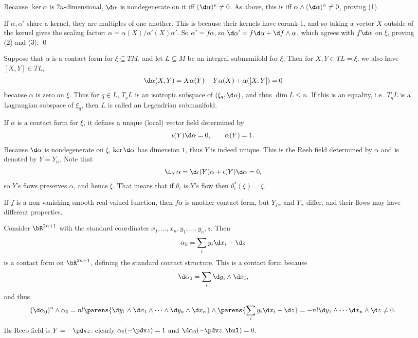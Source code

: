 \eprop

\bproof

    Because $\ker\alpha$ is $2n$-dimensional, $\d\alpha$ is nondegenerate on it iff $(\d\alpha)^n\neq0$.
    As above, this is iff $\alpha\wedge(\d\alpha)^n\neq0$, proving (1).

    If $\alpha,\alpha'$ share a kernel, they are multiples of one another.
    This is because their kernels have corank-$1$, and so taking a vector $X$ outside of the kernel gives
    the scaling factor: $\alpha=\alpha(X)/\alpha'(X)\alpha'$.
    So $\alpha'=f\alpha$, so $\d\alpha'=f\d\alpha+\d f\wedge\alpha$, which agrees with $f\d\alpha$
    on $\xi$, proving (2) and (3).
    \qed

\eproof

Suppose that $\alpha$ is a contact form for $\xi\subseteq TM$, and let $L\subseteq M$ be an integral
submanifold for $\xi$.
Then for $X,Y\in TL=\xi$, we also have $[X,Y]\in TL$,
$$ \d\alpha(X,Y) = X\alpha(Y) - Y\alpha(X) + \alpha([X,Y]) = 0 $$
because $\alpha$ is zero on $\xi$.
Thus for $q\in L$, $T_qL$ is an isotropic subspace of $(\xi_q,\d\alpha)$, and thus $\dim L\leq n$.
If this is an equality, i.e.\ $T_qL$ is a Lagrangian subspace of $\xi_q$, then $L$ is called an
{\emphcolor Legendrian} submanifold.

If $\alpha$ is a contact form for $\xi$, it defines a unique (local) vector field determined by
$$ \iota(Y)\d\alpha = 0,\qquad \alpha(Y) = 1. $$
Because $\d\alpha$ is nondegenerate on $\xi$, $\ker\d\alpha$ has dimension $1$, thus $Y$ is indeed unique.
This is the {\emphcolor Reeb field} determined by $\alpha$ and is denoted by $Y=Y_\alpha$.
Note that
$$ \L_Y\alpha = \d\iota(Y)\alpha + \iota(Y)\d\alpha = 0 , $$
so $Y$'s flows preserves $\alpha$, and hence $\xi$.
That means that if $\theta_t$ is $Y$'s flow then $\theta_t^*(\xi)=\xi$.

If $f$ is a non-vanishing smooth real-valued function, then $f\alpha$ is another contact form, but
$Y_{f\alpha}$ and $Y_\alpha$ differ, and their flows may have different properties.

\bexam

    Consider $\bR^{2n+1}$ with the standard coordinates $x_1,\dots,x_n,y_1,\dots,y_n,z$.
    Then
    $$ \alpha_0 = \sum_i y_i\d x_i - \d z $$
    is a contact form on $\bR^{2n+1}$, defining the {\emphcolor standard contact structure}.
    This is a contact form because
    $$ \d\alpha_0 = \sum_i\d y_i\wedge\d x_i , $$
    and thus
    $$ (\d\alpha_0)^n\wedge\alpha_0 = n!\parens{\d y_1\wedge\d x_1\wedge\cdots\wedge\d y_n\wedge\d x_n}\wedge
    \parens{\sum_i y_i\d x_i-\d z} = -n!\d y_1\wedge\cdots\d x_n\wedge\d z \neq 0 . $$
    Its Reeb field is $Y=-\pdv z$: clearly $\alpha_0(-\pdv z)=1$ and $\d\alpha_0(-\pdv z,\bul)=0$.

